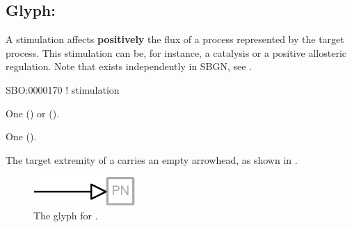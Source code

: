 \subsection{Glyph: }
\label{sec:stimulation}

A stimulation affects \textbf{positively} the flux of a process represented by the target process.
This stimulation can be, for instance, a catalysis or a positive allosteric regulation. Note that  exists independently in SBGN, see .

\begin{glyphDescription}

\glyphSboTerm
SBO:0000170 ! stimulation

\glyphOrigin
One  () or   ().

\glyphTarget
One  ().

\glyphSymbol
The target extremity of a  carries an empty arrowhead, as shown in .

\end{glyphDescription}

\begin{figure}[H]
  \centering
  \includegraphics{images/build/stimulation.pdf}
  \caption{The \PD glyph for .}
  \label{fig:stimulation}
\end{figure}
